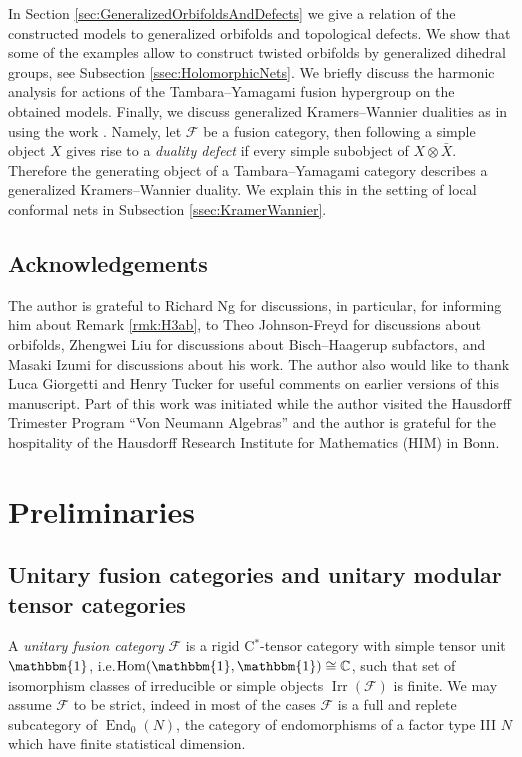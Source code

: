 \documentclass[twoside,11pt,reqno]{amsart}
\makeatletter
\theoremstyle{definition}
\theoremstyle{remark}
\newcommand{\cF}{\mathcal{F}}
\newcommand{\CC}{\mathbb{C}}
\DeclareMathOperator{\End}{End}
\DeclareMathOperator{\Hom}{Hom}
\DeclareRobustCommand{\ie}{i.e.\@\xspace}
\DeclareMathOperator{\Irr}{Irr}
\newcommand{\tu}{\mathbbm{1}} %
\newcommand{\myemph}[1]{\emph{#1}}
\makeatother
\begin{document}
In Section \ref{sec:GeneralizedOrbifoldsAndDefects} we give a relation of the 
constructed models to generalized orbifolds and topological defects.
We show that some of the examples allow to construct twisted orbifolds 
by generalized dihedral groups, see Subsection \ref{ssec:HolomorphicNets}.
We briefly discuss the harmonic analysis for actions of the 
Tambara--Yamagami fusion hypergroup on the obtained models.
Finally, we discuss generalized Kramers--Wannier dualities as in
\cite{FrFuRuSc2004} using the work \cite{BiKaLoRe2014}.
Namely, let $\cF$ be a fusion category, then following \cite{FrFuRuSc2004} a 
simple object $X$ gives rise to a \myemph{duality defect} 
if every simple subobject of 
$X\otimes \bar X$.
Therefore the generating object of a Tambara--Yamagami category describes a 
generalized Kramers--Wannier duality.
We explain this in the setting of local conformal nets
in Subsection \ref{ssec:KramerWannier}.




%
\subsection*{Acknowledgements}
The author is grateful to Richard Ng for discussions, in particular, 
for informing him about Remark \ref{rmk:H3ab},
to Theo Johnson-Freyd for discussions about orbifolds, 
Zhengwei Liu for discussions about Bisch--Haagerup subfactors,
and Masaki Izumi for discussions about his work.
The author also would like to thank Luca Giorgetti and Henry Tucker for useful
comments on earlier versions of this manuscript.
Part of this work was initiated while the author visited the
Hausdorff Trimester Program ``Von Neumann Algebras'' and the author is grateful
for the hospitality of the Hausdorff Research Institute for Mathematics (HIM)
in Bonn.


%
%
\section{Preliminaries}
\label{sec:Preliminaries}

%
\subsection{Unitary fusion categories and unitary modular tensor categories}
\label{ssec:UFCsAndUMTCs}
A \myemph{unitary fusion category} $\cF$ is a rigid C${}^{\ast}$-tensor category
with simple tensor unit $\tu$, \ie $\Hom(\tu,\tu)\cong \CC$, 
such that set of isomorphism classes of irreducible or simple objects 
$\Irr(\cF)$ is finite.
We may assume $\cF$ to be strict, indeed in most of the cases $\cF$
is a full and replete subcategory of $\End_0(N)$, the category of endomorphisms
of a factor type III $N$ which have finite statistical dimension.
%
%
\end{document}
